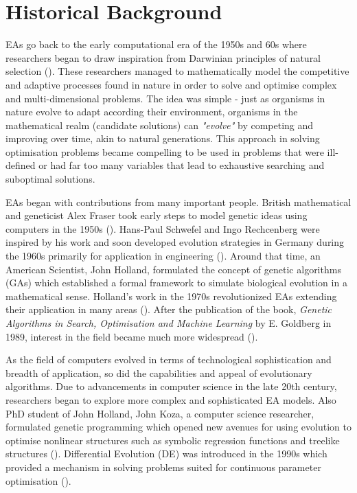 \section{Historical Background}\label{historical_background}
EAs go back to the early computational era of the 1950s and 60s where researchers began to draw inspiration from Darwinian principles of natural selection (\cite{alainsanaEvolutionaryAlgorithms}). These researchers managed to mathematically model the competitive and adaptive processes found in nature in order to solve and optimise complex and multi-dimensional problems. The idea was simple - just as organisms in nature evolve to adapt according their environment, organisms in the mathematical realm (candidate solutions) can \textit{"evolve"} by competing and improving over time, akin to  natural generations. This approach in solving optimisation problems became compelling to be used in problems that were ill-defined or had far too many variables that lead to exhaustive searching and suboptimal solutions. 

\parbreak\noindent EAs began with contributions from many important people. British mathematical and geneticist Alex Fraser took early steps to model genetic ideas using computers in the 1950s (\cite{links2002alex}). Hans-Paul Schwefel and Ingo Rechcenberg were inspired by his work and soon developed evolution strategies in Germany during the 1960s primarily for application in engineering (\cite{alainsanaEvolutionaryAlgorithms}). Around that time, an American Scientist, John Holland, formulated the concept of genetic algorithms (GAs) which established a formal framework to simulate biological evolution in a mathematical sense. Holland's work in the 1970s revolutionized EAs extending their application in many areas (\cite{alainsanaEvolutionaryAlgorithms}). After the publication of the book, \textit{Genetic Algorithms in Search, Optimisation and Machine Learning} by E. Goldberg in 1989, interest in the field became much more widespread (\cite{alainsanaEvolutionaryAlgorithms}).

\parbreak\noindent As the field of computers evolved in terms of technological sophistication and breadth of application, so did the capabilities and appeal of evolutionary algorithms. Due to advancements in computer science in the late 20th century, researchers began to explore more complex and sophisticated EA models. Also PhD student of John Holland, John Koza, a computer science researcher, formulated genetic programming which opened new avenues for using evolution to optimise non\-linear structures such as symbolic regression functions and tree\-like structures (\cite{koza1994genetic}). Differential Evolution (DE) was introduced in the 1990s which provided a mechanism in solving problems suited for continuous parameter optimisation (\cite{das2010differential}).

